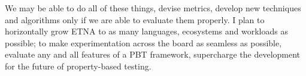 We may be able to do all of these things, devise metrics, develop new techniques and
algorithms only if we are able to evaluate them properly. I plan to horizontally grow
ETNA to as many languages, ecosystems and workloads as possible; to make
experimentation across the board as seamless as possible, evaluate any and all features
of a PBT framework, supercharge the development for the future of property-based
testing.
